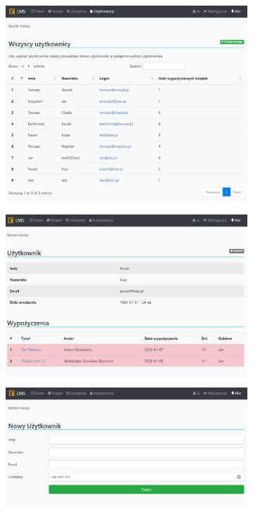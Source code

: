 \begin{figure}[H]
    \centering
    \begin{subfigure}[b]{0.3\textwidth}
        \includegraphics[width=\textwidth]{images/us}
        \label{fig:us}
    \end{subfigure}
    \hfill
    \begin{subfigure}[b]{0.3\textwidth}
        \includegraphics[width=\textwidth]{images/us1}
        \label{fig:us1}
    \end{subfigure}
    \hfill
    \begin{subfigure}[b]{0.3\textwidth}
        \includegraphics[width=\textwidth]{images/us2}

\end{subfigure}
\end{figure}
